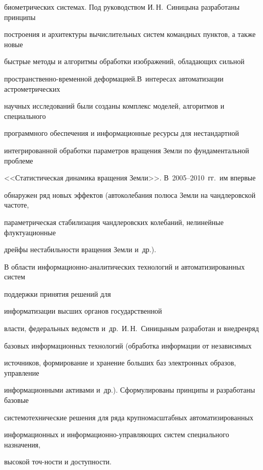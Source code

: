 биометрических системах. Под руководством И.\,Н.~Синицына разработаны принципы 

построения и архитектуры вычислительных систем командных пунктов, а также новые 

быст\-рые методы и алгоритмы обработки изображений, обла\-да\-ющих сильной 

пространственно-временной де\-фор\-ма\-ци\-ей.\linebreak В~интересах автоматизации астрометрических 

научных исследований были созданы комплекс моделей, алгоритмов и специального 

программного обеспечения и информационные ресурсы для нестандартной 

интегрированной обработки параметров вращения Земли по фундаментальной проблеме 

<<Статистическая динамика вращения Земли>>. В~2005--2010~гг.\ им впервые 

обнаружен ряд новых эффектов (автоколебания полюса Земли на чандлеровской частоте, 

параметрическая стабилизация чандлеровских колебаний, нелинейные флуктуационные 

дрейфы не\-ста\-биль\-ности вращения Земли и~др.).

     

     В области информационно-аналитических технологий и автоматизированных систем 

поддержки принятия решений для\linebreak 

информатизации высших органов государственной 

власти, федеральных ведомств и~др.\ И.\,Н.~Синицыным разработан и внедрен\linebreak ряд 

базовых информационных технологий (обработка информации от независимых 

источников, формирование и хранение больших баз электронных образов, управление 

информационными активами и~др.). Сформулированы принципы и разработаны базовые 

системотехнические решения для ряда крупномасштабных автоматизированных 

информационных и ин\-фор\-ма\-ци\-он\-но-управ\-ля\-ющих систем специального назначения, 

высокой точ-\linebreak ности и доступности. 

